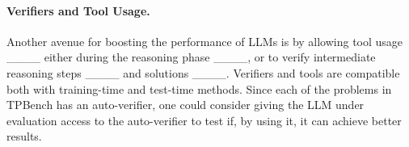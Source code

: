 \paragraph{Verifiers and Tool Usage.}
Another avenue for boosting the performance of LLMs is by allowing tool usage ____ either during the reasoning phase ____, or to verify intermediate reasoning steps ____ and solutions ____. Verifiers and tools are compatible both with training-time and test-time methods. Since each of the problems in TPBench has an auto-verifier, one could consider giving the LLM under evaluation access to the auto-verifier to test if, by using it, it can achieve better results.